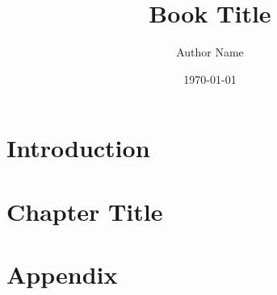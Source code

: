 \documentclass[12pt]{book}
\begin{document}
\title{Book Title}
\author{Author Name}
\date{\today}
\maketitle

\tableofcontents
\chapter{Introduction}

\chapter{Chapter Title}

\appendix
\chapter{Appendix}



\end{document}
